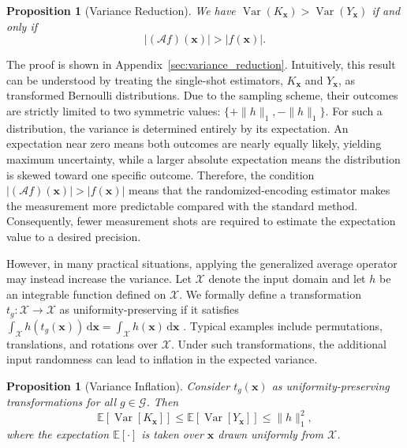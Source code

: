 \documentclass[%
 reprint,
 amsmath,amssymb,
 aps,
 pra,
]{revtex4-2}
\newtheorem{proposition}[theorem]{Proposition}
\theoremstyle{definition}
\begin{document}
\begin{proposition}[Variance Reduction]
\label{prop:noise_down}
We have \(\operatorname{Var}(K_{\bm{x}}) > \operatorname{Var}(Y_{\bm{x}})\) if and only if
\begin{equation}
|(\mathcal{A}f)(\bm{x})| > |f(\bm{x})|.
\end{equation}
\end{proposition}

The proof is shown in Appendix~\ref{sec:variance_reduction}. Intuitively, this result can be understood by treating the single-shot estimators, \(K_{\bm{x}}\) and \(Y_{\bm{x}}\), as transformed Bernoulli distributions. Due to the sampling scheme, their outcomes are strictly limited to two symmetric values: \(\{+\|h\|_1, -\|h\|_1\}\). For such a distribution, the variance is determined entirely by its expectation. An expectation near zero means both outcomes are nearly equally likely, yielding maximum uncertainty, while a larger absolute expectation means the distribution is skewed toward one specific outcome. Therefore, the condition \(|(\mathcal{A}f)(\bm{x})| > |f(\bm{x})|\) means that the randomized-encoding estimator makes the measurement more predictable compared with the standard method. Consequently, fewer measurement shots are required to estimate the expectation value to a desired precision.

However, in many practical situations, applying the generalized average operator may instead increase the variance. Let \(\mathcal{X}\) denote the input domain and let \(h\) be an integrable function defined on \(\mathcal{X}\). We formally define a transformation \(t_g:\mathcal{X} \rightarrow \mathcal{X}\) as uniformity-preserving if it satisfies \(\int_{\mathcal{X}} h(t_g(\bm{x}))\,\mathrm{d}\bm{x} = \int_{\mathcal{X}} h(\bm{x})\,\mathrm{d}\bm{x}\) \cite{Basu2016}. Typical examples include permutations, translations, and rotations over \(\mathcal{X}\). Under such transformations, the additional input randomness can lead to inflation in the expected variance.

\begin{proposition}[Variance Inflation]
\label{prop:noise_up}
Consider \(t_g(\bm{x})\) as uniformity-preserving transformations for all \(g\in\mathcal{G}\). Then
\begin{equation}
\mathbb{E}\left[\operatorname{Var}\left[K_{\bm{x}}\right]\right] \leq \mathbb{E}\left[\operatorname{Var}\left[Y_{\bm{x}}\right]\right] \leq  \|h\|_1^2,
\end{equation}
where the expectation \(\mathbb{E}[\cdot]\) is taken over \(\bm{x}\) drawn uniformly from \(\mathcal{X}\).
\end{proposition}
\end{document}
